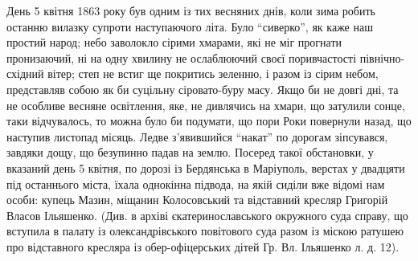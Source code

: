 \documentclass[a4paper,20pt]{report}
\begin{document}
День 5 квітня 1863 року був одним із тих весняних днів, коли зима робить
останню вилазку супроти наступаючого літа. Було ``сиверко'', як каже наш
простий народ; небо заволокло сірими хмарами, які не міг прогнати пронизаючий,
ні на одну хвилину не ослаблюючий своєї поривчастості північно-східний вітер;
степ не встиг ще покритись зеленню, і разом із сірим небом, представляв собою
як би суцільну сіровато-буру масу. Якщо би не довгі дні, та не особливе весняне
освітлення, яке, не дивлячись на хмари, що затулили сонце, таки відчувалось, то
можна було би подумати, що пори Роки повернули назад, що наступив листопад
місяць. Ледве з'явившийся ``накат'' по дорогам зіпсувався, завдяки дощу, що
безупинно падав на землю. Посеред такої обстановки, у вказаний день 5 квітня,
по дорозі із Бердянська в Маріуполь, верстах у двадцяти під останнього міста,
їхала однокінна підвода, на якій сиділи вже відомі нам особи: купець Мазин,
міщанин Колосовський та відставний кресляр Григорій Власов Ільяшенко. (Див. в
архіві єкатеринославського окружного суда справу, що вступила в палату із
олександрівського повітового суда разом із міскою ратушею про відставного
кресляра із обер-офіцерських дітей Гр. Вл. Ільяшенко л. д. 12).
\end{document}
